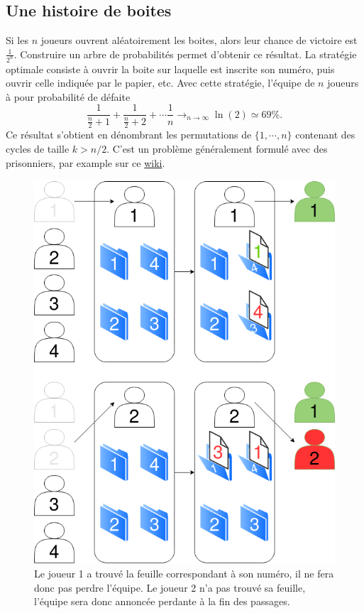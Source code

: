 \documentclass[a4paper,10pt,oneside]{article}
\begin{document}
\subsection{Une histoire de boites}

Si les $n$ joueurs ouvrent aléatoirement les boites, alors leur chance de victoire est $\frac{1}{2^n}$. 
Construire un arbre de probabilités permet d'obtenir ce résultat.
La stratégie optimale consiste à ouvrir la boite sur laquelle est inscrite son numéro, puis ouvrir celle indiquée par le papier, etc. 
Avec cette stratégie, l'équipe de $n$ joueurs à pour probabilité de défaite
\[
  \frac{1}{\frac{n}{2} +1} + \frac{1}{\frac{n}{2} + 2} + \cdots \frac{1}{n} 
  \rightarrow_{n\rightarrow \infty} \ln(2) \simeq 69\%.
\]
Ce résultat s'obtient en dénombrant les permutations de $\{1,\cdots,n\}$ contenant des cycles de taille $k > n/2$.
C'est un problème généralement formulé avec des prisonniers, par example sur ce \href{https://en.wikipedia.org/wiki/100_prisoners_problem}{wiki}.


\begin{figure}[!ht]
\centering
\includegraphics[height=0.3\textheight]{figures/indice_boites.png}
\caption{Le joueur 1 a trouvé la feuille correspondant à son numéro, il ne fera donc pas perdre l'équipe. Le joueur 2 n'a pas trouvé sa feuille, l'équipe sera donc annoncée perdante à la fin des passages.}
\end{figure}


\newpage
  

\end{document}
